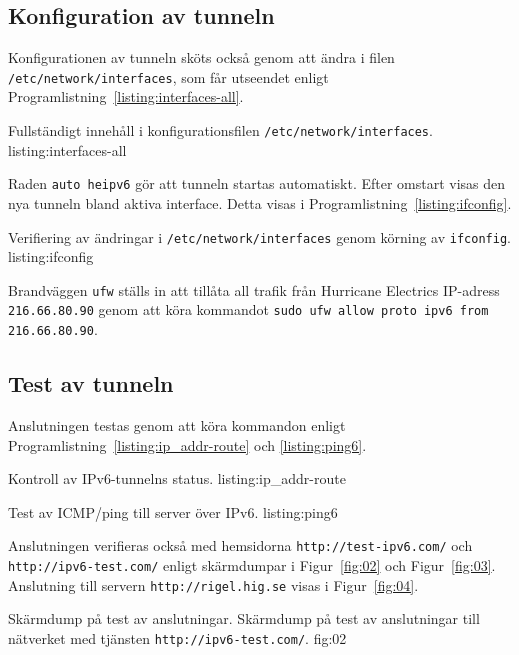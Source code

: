 \subsection{Konfiguration av tunneln}
Konfigurationen av tunneln sköts också genom att ändra i filen
\texttt{/etc/network/interfaces}, som får utseendet enligt
Programlistning~\ref{listing:interfaces-all}.

						 {Fullständigt innehåll i konfigurationsfilen
							\texttt{/etc/network/interfaces}.}
             {listing:interfaces-all}


Raden \texttt{auto heipv6} gör att tunneln startas automatiskt.
Efter omstart visas den nya tunneln bland aktiva interface. Detta visas i  
Programlistning~\ref{listing:ifconfig}.

            {Verifiering av ändringar i \texttt{/etc/network/interfaces}
             genom körning av \texttt{ifconfig}.}
            {listing:ifconfig}

Brandväggen \texttt{ufw} ställs in att tillåta all trafik från Hurricane
Electrics IP-adress \texttt{216.66.80.90} genom att köra kommandot \texttt{sudo
ufw allow proto ipv6 from 216.66.80.90}.

\subsection{Test av tunneln}
Anslutningen testas genom att köra kommandon enligt 
Programlistning~\ref{listing:ip_addr-route} och \ref{listing:ping6}.

            {Kontroll av IPv6-tunnelns status.}
            {listing:ip_addr-route}

            {Test av ICMP/ping till server över IPv6.}
            {listing:ping6}

Anslutningen verifieras också med hemsidorna \texttt{http://test-ipv6.com/} och
\texttt{http://ipv6-test.com/} enligt skärmdumpar i Figur~\ref{fig:02} och
Figur~\ref{fig:03}.
Anslutning till servern \texttt{http://rigel.hig.se} visas i
Figur~\ref{fig:04}.

           {Skärmdump på test av anslutningar.}
					 {Skärmdump på test av anslutningar till nätverket med tjänsten
						\texttt{http://ipv6-test.com/}.}
           {fig:02}

